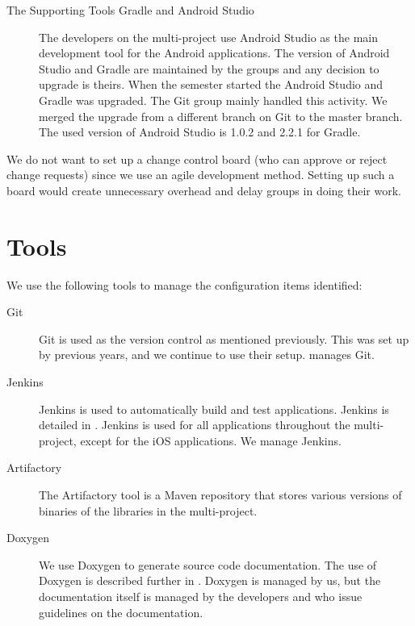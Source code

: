 \begin{description}
  \item[The Supporting Tools Gradle and Android Studio] The developers on the multi-project use Android Studio as the main development tool for the Android applications. The version of Android Studio and Gradle are maintained by the \bd groups and any decision to upgrade is theirs. When the semester started the Android Studio and Gradle was upgraded. The Git group mainly handled this activity. We merged the upgrade from a different branch on Git to the master branch. The used version of Android Studio is 1.0.2 and 2.2.1 for Gradle.
\end{description}

We do not want to set up a change control board\parencite[p. 6-9]{swebok} (who can approve or reject change requests) since we use an agile development method. Setting up such a board would create unnecessary overhead and delay groups in doing their work.

\section{Tools}\label{sec:SCM_tools}
We use the following tools to manage the configuration items identified:

\begin{description}
  \item[Git] Git is used as the version control as mentioned previously. This was set up by previous years, and we continue to use their setup.  manages Git.
  \item[Jenkins] Jenkins is used to automatically build and test applications. Jenkins is detailed in . Jenkins is used for all applications throughout the multi-project, except for the iOS applications. We manage Jenkins.
  \item[Artifactory] The Artifactory tool is a Maven repository that stores various versions of binaries of the libraries in the multi-project. 
  \item[Doxygen] We use Doxygen to generate source code documentation. The use of Doxygen is described further in . Doxygen is managed by us, but the documentation itself is managed by the developers and  who issue guidelines on the documentation.
\end{description}